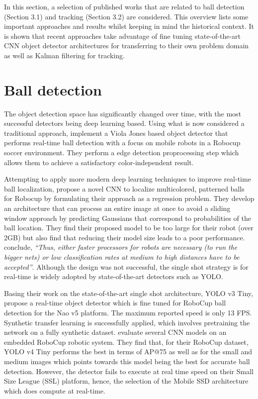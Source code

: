 \documentclass[a4paper,twoside,12pt]{report}
\begin{document}
In this section, a selection of published works that are related to ball detection  (Section 3.1) and tracking (Section 3.2) are considered. This overview lists some important approaches and results whilst keeping in mind the historical context. It is shown that recent approaches take advantage of fine tuning state-of-the-art CNN object detector architectures for transferring to their own problem domain as well as Kalman filtering for tracking.

\section{Ball detection}

The object detection space has significantly changed over time, with the most successful detectors being deep learning based. Using what is now considered a traditional approach, \cite{robovj} implement a Viola Jones based object detector that performs real-time ball detection with a focus on mobile robots in a Robocup soccer environment. They perform a edge detection proprocessing step which allows them to achieve a satisfactory color-independent result.

Attempting to apply more modern deep learning techniques to improve real-time ball localization, \cite{selfcnn} propose a novel CNN to localize multicolored, patterned balls for Robocup by formulating their approach as a regression problem. They develop an architecture that can process an entire image at once to avoid a sliding window approach by predicting Gaussians that correspond to probabilities of the ball location. They find their proposed model to be too large for their robot (over 2GB) but also find that reducing their model size leads to a poor performance. \cite{selfcnn} conclude, \textit{``Thus, either faster processors for robots are necessary (to run the bigger nets) or low classification rates at medium to high distances have to be accepted''}. Although the design was not successful, the single shot strategy is for real-time is widely adopted by state-of-the-art detectors such as YOLO.

Basing their work on the state-of-the-art single shot architecture, YOLO v3 Tiny, \cite{robo} propose a real-time object detector which is fine tuned for RoboCup ball detection for the Nao v5 platform. The maximum reported speed is only 13 FPS. Synthetic transfer learning is successfully applied, which involves pretraining the network on a fully synthetic dataset. \cite{robocupdataset} evaluate several CNN models on an embedded RoboCup robotic system. They find that, for their RoboCup dataset, YOLO v4 Tiny performs the best in terms of AP@75 as well as for the small and medium images which points towards this model being the best for accurate ball detection. However, the detector fails to execute at real time speed on their Small Size League (SSL) platform, hence, the selection of the Mobile SSD architecture which does compute at real-time.
\end{document}
